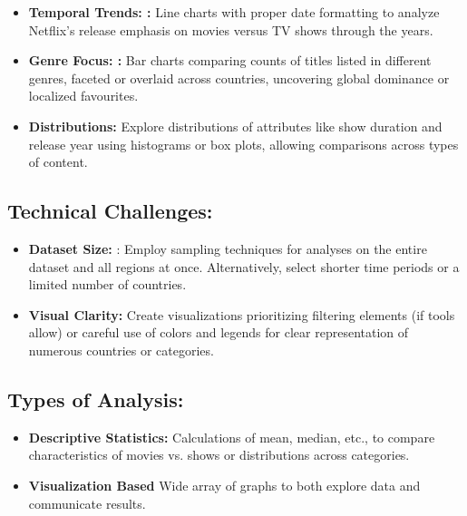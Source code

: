 \documentclass[12pt]{article}
\begin{document}
\begin{itemize}
\item 	\textbf{Temporal Trends: :} \newline
Line charts with proper date formatting to analyze Netflix's release emphasis on movies versus TV shows through the years.
\item 	\textbf{Genre Focus: :}\newline
Bar charts comparing counts of titles listed in different genres, faceted or overlaid across countries, uncovering global dominance or localized favourites.
\item 	\textbf{Distributions:}\newline
Explore distributions of attributes like show duration and release year using histograms or box plots, allowing comparisons across types of content.


\end{itemize}

\subsection{Technical Challenges:}


\begin{itemize}
\item 	\textbf{Dataset Size:} \newline
: Employ sampling techniques for analyses on the entire dataset and all regions at once. Alternatively, select shorter time periods or a limited number of countries.
\item 	\textbf{Visual Clarity: }\newline
Create visualizations prioritizing filtering elements (if tools allow) or careful use of colors and legends for clear representation of numerous countries or categories.



\end{itemize}

\subsection{Types of Analysis:}


\begin{itemize}
\item 	\textbf{Descriptive Statistics: } \newline
Calculations of mean, median, etc., to compare characteristics of movies vs. shows or distributions across categories.
\item 	\textbf{Visualization Based }\newline
Wide array of graphs to both explore data and communicate results.



\end{itemize}
\end{document}
